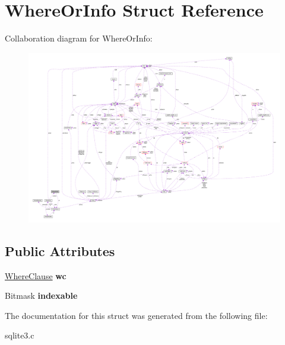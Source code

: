 \hypertarget{struct_where_or_info}{\section{Where\-Or\-Info Struct Reference}
\label{struct_where_or_info}
}


Collaboration diagram for Where\-Or\-Info\-:\nopagebreak
\begin{figure}[H]
\begin{center}
\leavevmode
\includegraphics[width=350pt]{struct_where_or_info__coll__graph}
\end{center}
\end{figure}
\subsection*{Public Attributes}
\begin{DoxyCompactItemize}
\item 
\hypertarget{struct_where_or_info_a45bb04e5ea24ec549f060bc8b210ec71}{\hyperlink{struct_where_clause}{Where\-Clause} {\bfseries wc}}\label{struct_where_or_info_a45bb04e5ea24ec549f060bc8b210ec71}

\item 
\hypertarget{struct_where_or_info_a39777f291e1e516f01b05b71a9805357}{Bitmask {\bfseries indexable}}\label{struct_where_or_info_a39777f291e1e516f01b05b71a9805357}

\end{DoxyCompactItemize}


The documentation for this struct was generated from the following file\-:\begin{DoxyCompactItemize}
\item 
sqlite3.\-c\end{DoxyCompactItemize}
